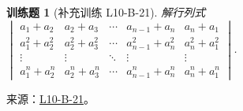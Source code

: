 \documentclass[12pt,fontset=fandol]{ctexart}
\newtheorem{exercise}{训练题}[section]
\begin{document}
\begin{exercise}[补充训练 L10-B-21]\label{prob:L10-B-21}
解行列式 $\begin{vmatrix}
                a_{1}+a_{2}         & a_{2}+a_{3}         & \cdots & a_{n-1}+a_n         & a_n+a_{1}         \\
                a_{1}^{2}+a_{2}^{2} & a_{2}^{2}+a_{3}^{2} & \cdots & a_{n-1}^{2}+a_n^{2} & a_n^{2}+a_{1}^{2} \\
                \vdots              & \vdots              & \ddots & \vdots              & \vdots            \\
                a_{1}^{n}+a_{2}^{n} & a_{2}^{n}+a_{3}^{n} & \cdots & a_{n-1}^{n}+a_n^{n} & a_n^{n}+a_{1}^{n}
            \end{vmatrix}$.
\end{exercise}
\noindent 来源：\href{https://github.com/yhwu-is/Linear-Algebra-Left-Undone/blob/new/%E8%AE%B2%E4%B9%89/%E4%B8%93%E9%A2%98/10%20%E8%A1%8C%E5%88%97%E5%BC%8F.tex}{L10-B-21}。
\end{document}
